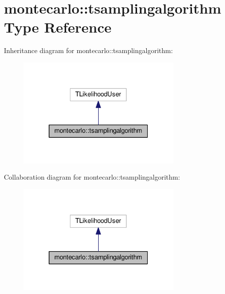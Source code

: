 \hypertarget{structmontecarlo_1_1tsamplingalgorithm}{}\section{montecarlo\+:\+:tsamplingalgorithm Type Reference}
\label{structmontecarlo_1_1tsamplingalgorithm}


Inheritance diagram for montecarlo\+:\+:tsamplingalgorithm\+:
\nopagebreak
\begin{figure}[H]
\begin{center}
\leavevmode
\includegraphics[width=232pt]{structmontecarlo_1_1tsamplingalgorithm__inherit__graph}
\end{center}
\end{figure}


Collaboration diagram for montecarlo\+:\+:tsamplingalgorithm\+:
\nopagebreak
\begin{figure}[H]
\begin{center}
\leavevmode
\includegraphics[width=232pt]{structmontecarlo_1_1tsamplingalgorithm__coll__graph}
\end{center}
\end{figure}
